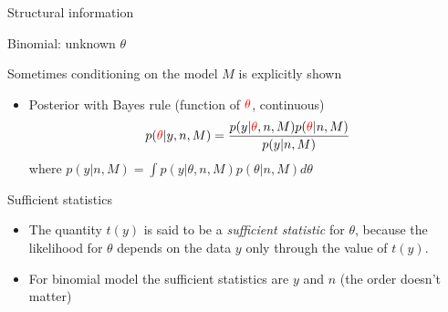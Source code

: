 \documentclass[english,t]{beamer}
\begin{document}
\begin{frame}{Structural information }

  
\end{frame}

\begin{frame}{Binomial: unknown $\theta$}

  Sometimes conditioning on the model $M$ is explicitly shown
  
  \begin{itemize}
  \item {\color{blue}Posterior} with Bayes rule (function of ${\color{red}\theta}$, continuous)
    \begin{equation*}
      p({\color{red}\theta}|y,n,M)=\frac{p(y|{\color{red}\theta},n,M)p({\color{red}\theta}|n,M)}{p(y|n,M)}
    \end{equation*}
    where $p(y|n,M)=\int p(y|\theta,n,M)p(\theta|n,M) d\theta$
    \vspace{0.5\baselineskip}
  \end{itemize}

\end{frame}

\begin{frame}{Sufficient statistics}

  \begin{itemize}
  \item<+-> The quantity $t(y)$ is said to be a {\em sufficient statistic}
    for $\theta$, because the likelihood for $\theta$ depends on the
    data $y$ only through the value of $t(y)$.
  \item<+-> For binomial model the sufficient statistics are $y$ and
    $n$ (the order doesn't matter)
  \end{itemize}

\end{frame}
\end{document}
